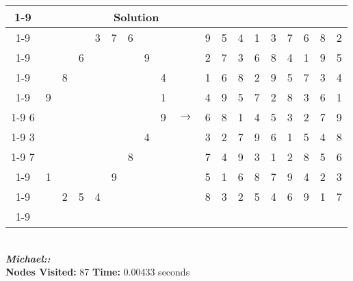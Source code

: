 \documentclass{article}
\begin{document}
\begin{tabular}{||c|c|c||c|c|c||c|c|c|| c ||c|c|c||c|c|c||c|c|c||}
  \cmidrule{1-9} \cmidrule{11-19}
  \multicolumn{9}{|c|}{Problem} &                   & \multicolumn{9}{|c|}{Solution}   \\\cmidrule{1-9} \cmidrule{11-19} \morecmidrules \cmidrule{1-9} \cmidrule{11-19}
  &   &   &   & 3 & 7 & 6 &   &   &  & 9 & 5 & 4 & 1 & 3 & 7 & 6 & 8 & 2\\\cmidrule{1-9} \cmidrule{11-19}
  &   &   & 6 &   &   &   & 9 &   &  & 2 & 7 & 3 & 6 & 8 & 4 & 1 & 9 & 5\\\cmidrule{1-9} \cmidrule{11-19}
  &   & 8 &   &   &   &   &   & 4 &  & 1 & 6 & 8 & 2 & 9 & 5 & 7 & 3 & 4\\\cmidrule{1-9} \cmidrule{11-19} \morecmidrules \cmidrule{1-9} \cmidrule{11-19}
  & 9 &   &   &   &   &   &   & 1 &  & 4 & 9 & 5 & 7 & 2 & 8 & 3 & 6 & 1\\\cmidrule{1-9} \cmidrule{11-19}
6 &   &   &   &   &   &   &   & 9 & $\rightarrow$ & 6 & 8 & 1 & 4 & 5 & 3 & 2 & 7 & 9\\\cmidrule{1-9} \cmidrule{11-19}
3 &   &   &   &   &   &   & 4 &   &  & 3 & 2 & 7 & 9 & 6 & 1 & 5 & 4 & 8\\\cmidrule{1-9} \cmidrule{11-19} \morecmidrules \cmidrule{1-9} \cmidrule{11-19}
7 &   &   &   &   &   & 8 &   &   &  & 7 & 4 & 9 & 3 & 1 & 2 & 8 & 5 & 6\\\cmidrule{1-9} \cmidrule{11-19}
  & 1 &   &   &   & 9 &   &   &   &  & 5 & 1 & 6 & 8 & 7 & 9 & 4 & 2 & 3\\\cmidrule{1-9} \cmidrule{11-19}
  &   & 2 & 5 & 4 &   &   &   &   &  & 8 & 3 & 2 & 5 & 4 & 6 & 9 & 1 & 7\\\cmidrule{1-9} \cmidrule{11-19} \morecmidrules \cmidrule{1-9} \cmidrule{11-19}
\end{tabular}
\\
\small\emph{\textbf{Michael::}}\\ \textbf{Nodes Visited:} 87 \textbf{Time:} 0.00433 seconds\\
\end{document}
